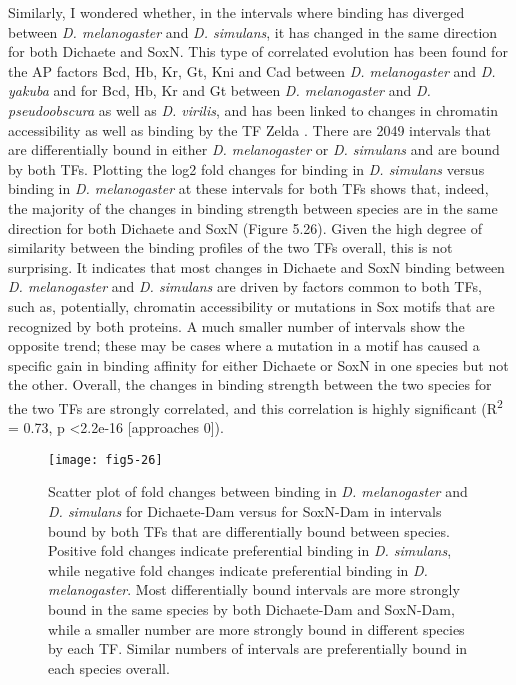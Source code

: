 Similarly, I wondered whether, in the intervals where binding has diverged between \emph{D. melanogaster} and \emph{D. simulans}, it has changed in the same direction for both Dichaete and SoxN. This type of correlated evolution has been found for the AP factors Bcd, Hb, Kr, Gt, Kni and Cad between \emph{D. melanogaster} and \emph{D. yakuba} and for Bcd, Hb, Kr and Gt between \emph{D. melanogaster} and \emph{D. pseudoobscura} as well as \emph{D. virilis}, and has been linked to changes in chromatin accessibility as well as binding by the TF Zelda \citep{bradley_binding_2010,paris_extensive_2013}. There are 2049 intervals that are differentially bound in either \emph{D. melanogaster} or \emph{D. simulans} and are bound by both TFs. Plotting the log2 fold changes for binding in \emph{D. simulans} versus binding in \emph{D. melanogaster} at these intervals for both TFs shows that, indeed, the majority of the changes in binding strength between species are in the same direction for both Dichaete and SoxN (Figure 5.26). Given the high degree of similarity between the binding profiles of the two TFs overall, this is not surprising. It indicates that most changes in Dichaete and SoxN binding between \emph{D. melanogaster} and \emph{D. simulans} are driven by factors common to both TFs, such as, potentially, chromatin accessibility or mutations in Sox motifs that are recognized by both proteins. A much smaller number of intervals show the opposite trend; these may be cases where a mutation in a motif has caused a specific gain in binding affinity for either Dichaete or SoxN in one species but not the other. Overall, the changes in binding strength between the two species for the two TFs are strongly correlated, and this correlation is highly significant (R\textsuperscript{2} = 0.73, p \textless 2.2e-16 [approaches 0]).

\begin{figure}[H]
\centering
\texttt{[image: fig5-26]}
\caption{Scatter plot of fold changes between binding in \emph{D. melanogaster} and \emph{D. simulans} for Dichaete-Dam versus for SoxN-Dam in intervals bound by both TFs that are differentially bound between species. Positive fold changes indicate preferential binding in \emph{D. simulans}, while negative fold changes indicate preferential binding in \emph{D. melanogaster}. Most differentially bound intervals are more strongly bound in the same species by both Dichaete-Dam and SoxN-Dam, while a smaller number are more strongly bound in different species by each TF. Similar numbers of intervals are preferentially bound in each species overall.}
\label{Figure 5.26}
\end{figure}

